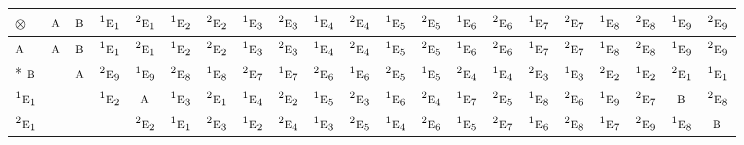\documentclass[10pt,a4paper]{article}
\numberwithin{equation}{section}
\newcommand{\irr}[1]{\text{\normalfont\scshape #1}}
\newcommand{\conjpair}[1]{{}^{#1}}
\newcommand{\irrprod}{\otimes}
\begin{document}
{\small\setlength{\tabcolsep}{3pt}\begin{longtable}{@{}lcccccccccccccccccccc@{}}\toprule
$\irrprod$ & $\irr{a}$ & $\irr{b}$ & $\conjpair{1}\irr{e}_{1}$ & $\conjpair{2}\irr{e}_{1}$ & $\conjpair{1}\irr{e}_{2}$ & $\conjpair{2}\irr{e}_{2}$ & $\conjpair{1}\irr{e}_{3}$ & $\conjpair{2}\irr{e}_{3}$ & $\conjpair{1}\irr{e}_{4}$ & $\conjpair{2}\irr{e}_{4}$ & $\conjpair{1}\irr{e}_{5}$ & $\conjpair{2}\irr{e}_{5}$ & $\conjpair{1}\irr{e}_{6}$ & $\conjpair{2}\irr{e}_{6}$ & $\conjpair{1}\irr{e}_{7}$ & $\conjpair{2}\irr{e}_{7}$ & $\conjpair{1}\irr{e}_{8}$ & $\conjpair{2}\irr{e}_{8}$ & $\conjpair{1}\irr{e}_{9}$ & $\conjpair{2}\irr{e}_{9}$\\\midrule\endhead
\bottomrule\endfoot\endlastfoot
$\irr{a}$ & $\irr{a}$ & $\irr{b}$ & $\conjpair{1}\irr{e}_{1}$ & $\conjpair{2}\irr{e}_{1}$ & $\conjpair{1}\irr{e}_{2}$ & $\conjpair{2}\irr{e}_{2}$ & $\conjpair{1}\irr{e}_{3}$ & $\conjpair{2}\irr{e}_{3}$ & $\conjpair{1}\irr{e}_{4}$ & $\conjpair{2}\irr{e}_{4}$ & $\conjpair{1}\irr{e}_{5}$ & $\conjpair{2}\irr{e}_{5}$ & $\conjpair{1}\irr{e}_{6}$ & $\conjpair{2}\irr{e}_{6}$ & $\conjpair{1}\irr{e}_{7}$ & $\conjpair{2}\irr{e}_{7}$ & $\conjpair{1}\irr{e}_{8}$ & $\conjpair{2}\irr{e}_{8}$ & $\conjpair{1}\irr{e}_{9}$ & $\conjpair{2}\irr{e}_{9}$\\*
$\irr{b}$ &  & $\irr{a}$ & $\conjpair{2}\irr{e}_{9}$ & $\conjpair{1}\irr{e}_{9}$ & $\conjpair{2}\irr{e}_{8}$ & $\conjpair{1}\irr{e}_{8}$ & $\conjpair{2}\irr{e}_{7}$ & $\conjpair{1}\irr{e}_{7}$ & $\conjpair{2}\irr{e}_{6}$ & $\conjpair{1}\irr{e}_{6}$ & $\conjpair{2}\irr{e}_{5}$ & $\conjpair{1}\irr{e}_{5}$ & $\conjpair{2}\irr{e}_{4}$ & $\conjpair{1}\irr{e}_{4}$ & $\conjpair{2}\irr{e}_{3}$ & $\conjpair{1}\irr{e}_{3}$ & $\conjpair{2}\irr{e}_{2}$ & $\conjpair{1}\irr{e}_{2}$ & $\conjpair{2}\irr{e}_{1}$ & $\conjpair{1}\irr{e}_{1}$\\
$\conjpair{1}\irr{e}_{1}$ &  &  & $\conjpair{1}\irr{e}_{2}$ & $\irr{a}$ & $\conjpair{1}\irr{e}_{3}$ & $\conjpair{2}\irr{e}_{1}$ & $\conjpair{1}\irr{e}_{4}$ & $\conjpair{2}\irr{e}_{2}$ & $\conjpair{1}\irr{e}_{5}$ & $\conjpair{2}\irr{e}_{3}$ & $\conjpair{1}\irr{e}_{6}$ & $\conjpair{2}\irr{e}_{4}$ & $\conjpair{1}\irr{e}_{7}$ & $\conjpair{2}\irr{e}_{5}$ & $\conjpair{1}\irr{e}_{8}$ & $\conjpair{2}\irr{e}_{6}$ & $\conjpair{1}\irr{e}_{9}$ & $\conjpair{2}\irr{e}_{7}$ & $\irr{b}$ & $\conjpair{2}\irr{e}_{8}$\\
$\conjpair{2}\irr{e}_{1}$ &  &  &  & $\conjpair{2}\irr{e}_{2}$ & $\conjpair{1}\irr{e}_{1}$ & $\conjpair{2}\irr{e}_{3}$ & $\conjpair{1}\irr{e}_{2}$ & $\conjpair{2}\irr{e}_{4}$ & $\conjpair{1}\irr{e}_{3}$ & $\conjpair{2}\irr{e}_{5}$ & $\conjpair{1}\irr{e}_{4}$ & $\conjpair{2}\irr{e}_{6}$ & $\conjpair{1}\irr{e}_{5}$ & $\conjpair{2}\irr{e}_{7}$ & $\conjpair{1}\irr{e}_{6}$ & $\conjpair{2}\irr{e}_{8}$ & $\conjpair{1}\irr{e}_{7}$ & $\conjpair{2}\irr{e}_{9}$ & $\conjpair{1}\irr{e}_{8}$ & $\irr{b}$\\

\end{longtable}}
\end{document}
